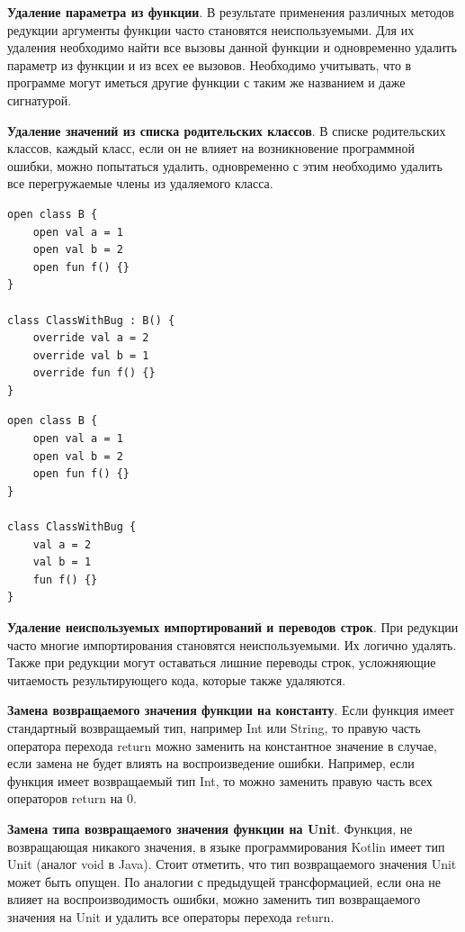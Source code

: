 \textbf{Удаление параметра из функции}. В результате применения различных методов редукции аргументы функции часто становятся неиспользуемыми. Для их удаления необходимо найти все вызовы данной функции и одновременно удалить параметр из функции и из всех ее вызовов. Необходимо учитывать, что в программе могут иметься другие функции с таким же названием и даже сигнатурой.

\textbf{Удаление значений из списка родительских классов}. В списке родительских классов, каждый класс, если он не влияет на возникновение программной ошибки, можно попытаться удалить, одновременно с этим необходимо удалить все перегружаемые члены из удаляемого класса.

\begin{lstlisting}
open class B {
    open val a = 1
    open val b = 2
    open fun f() {}
}

class ClassWithBug : B() {
    override val a = 2
    override val b = 1
    override fun f() {}
}
\end{lstlisting}

\begin{lstlisting}
open class B {
    open val a = 1
    open val b = 2
    open fun f() {}
}

class ClassWithBug {
    val a = 2
    val b = 1
    fun f() {}
}
\end{lstlisting}

\textbf{Удаление неиспользуемых импортирований и переводов строк}. При редукции часто многие импортирования становятся неиспользуемыми. Их логично удалять. Также при редукции могут оставаться лишние переводы строк, усложняющие читаемость результирующего кода, которые также удаляются.

\textbf{Замена возвращаемого значения функции на константу}. Если функция имеет стандартный возвращаемый тип, например Int или String, то правую часть оператора перехода return можно заменить на константное значение в случае, если замена не будет влиять на воспроизведение ошибки. Например, если функция имеет возвращаемый тип Int, то можно заменить правую часть всех операторов return на 0.

\textbf{Замена типа возвращаемого значения функции на Unit}. Функция, не возвращающая никакого значения, в языке программирования Kotlin имеет тип Unit (аналог void в Java). Стоит отметить, что тип возвращаемого значения Unit может быть опущен. По аналогии с предыдущей трансформацией, если она не влияет на воспроизводимость ошибки, можно заменить тип возвращаемого значения на Unit и удалить все операторы перехода return.

